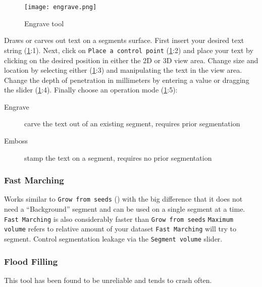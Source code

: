 \begin{figure}[h!]
	\centerline{
		\texttt{[image: engrave.png]}}
	\caption{Engrave tool}\label{fig:eng}
\end{figure}
\noindent
Draws or carves out text on a segments surface.
First insert your desired text string (\cref{fig:eng}:1).
Next, click on \texttt{Place a control point} (\cref{fig:eng}:2) and place your text by clicking on the desired position in either the 2D or 3D view area.
Change size and location by selecting either (\cref{fig:eng}:3) and manipulating the text in the view area.
Change the depth of penetration in millimeters by entering a value or dragging the slider (\cref{fig:eng}:4).
Finally choose an operation mode (\cref{fig:eng}:5):
\begin{description}
	\item [Engrave] carve the text out of an existing segment, requires prior segmentation
	\item [Emboss] stamp the text on a segment, requires no prior segmentation
\end{description}

\pagebreak
\subsubsection{Fast Marching}
\begin{figure}[h]
	\begin{subfigure}{0.2\textwidth}
		
	\end{subfigure}
	\begin{subfigure}{0.2\textwidth}
		
	\end{subfigure}
\end{figure}
\noindent
Works similar to \texttt{Grow from seeds} () with the big difference that it does not need a ``Background'' segment and can be used on a single segment at a time.
\texttt{Fast Marching} is also considerably faster than \texttt{Grow from seeds}
\texttt{Maximum volume} refers to relative amount of your dataset \texttt{Fast Marching} will try to segment.
Control segmentation leakage via the \texttt{Segment volume} slider.

\subsubsection{Flood Filling}
\begin{figure}[h]
	\begin{subfigure}{0.2\textwidth}
		
	\end{subfigure}
\end{figure}
\noindent
{}\cite{lassoSlicerSegmentEditorExtraEffects2024}
This tool has been found to be unreliable and tends to crash often.

